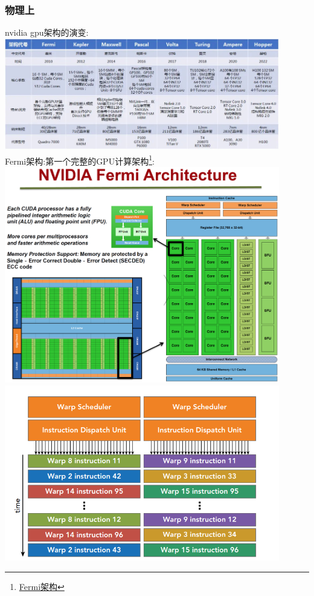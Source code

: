 \subsubsection{物理上}
\noindent
nvidia gpu架构的演变:\\
\includegraphics[width=0.9\textwidth]{assets/gpu.jpg}\\
Fermi架构:第一个完整的GPU计算架构\footnote{\href{https://www.nvidia.com/content/PDF/fermi_white_papers/NVIDIA_Fermi_Compute_Architecture_Whitepaper.pdf}{Fermi架构}}:\\
\includegraphics[width=0.9\textwidth]{assets/fermi.png}\\
\includegraphics[width=0.9\textwidth]{assets/warp.png}\\

